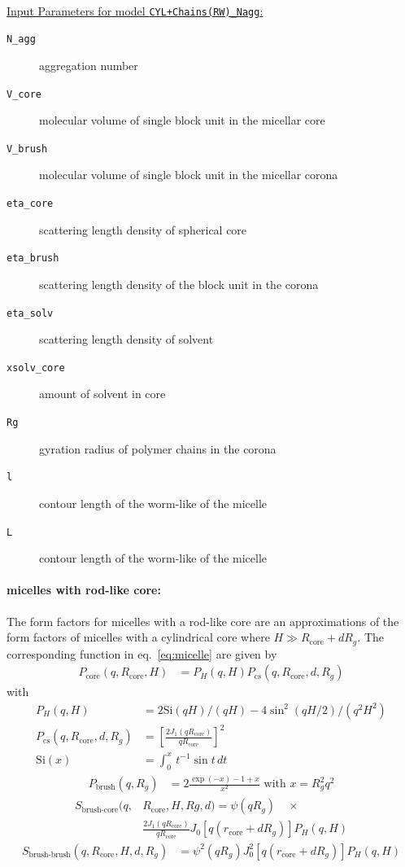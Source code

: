 \hspace{1pt}\\
\uline{Input Parameters for model \texttt{CYL+Chains(RW)\_Nagg}:}
\begin{description}
\item[\texttt{N\_agg}] aggregation number
\item[\texttt{V\_core}] molecular volume of single block unit in the micellar core
\item[\texttt{V\_brush}]  molecular volume of single block unit in the micellar corona
\item[\texttt{eta\_core}] scattering length density of spherical core
\item[\texttt{eta\_brush}] scattering length density of the block unit in the corona
\item[\texttt{eta\_solv}] scattering length density of solvent
\item[\texttt{xsolv\_core}] amount of solvent in core
\item[\texttt{Rg}] gyration radius of polymer chains in the corona
\item[\texttt{l}] contour length of the worm-like of the micelle
\item[\texttt{L}] contour length of the worm-like of the micelle
\end{description}



\clearpage
\noindent\paragraph{micelles with rod-like core:}
The form factors for micelles with a rod-like core are an approximations of the form factors of micelles
with a cylindrical core where $H\gg R_\text{core}+d R_g$. The corresponding function in
eq.\ \ref{eq:micelle} are given by
\begin{align}
P_\text{core}(q,R_\text{core},H) &= P_H(q,H) P_\text{cs}(q,R_\text{core},d,R_g)
\label{eq:rodlikeFF}
\end{align}
with
\begin{align}
P_H(q,H)    &= 2\text{Si}(qH)/(qH) - 4 \sin^2(qH/2)/(q^2H^2) \\
P_\text{cs}(q,R_\text{core},d,R_g) &= \left[ \frac{2J_1(qR_\text{core})}{qR_\text{core}} \right]^2 \\
\text{Si}(x) &= \int_0^x \, t^{-1} \sin t\, dt
\end{align}
\begin{align}
P_\text{brush}(q,R_g)&= 2\frac{\exp(-x)-1+x}{x^2} \text{~with~} x = R_g^2q^2
\end{align}
\begin{align}
S_\text{brush-core}(q,& R_\text{core},H,Rg,d) = \psi(qR_g) \quad \times \\
                           & \frac{2J_1(qR_\text{core})}{qR_\text{core}}
                            J_0[q(r_\text{core}+dR_g)] P_H(q,H) \nonumber
\end{align}
\begin{align}
S_\text{brush-brush}(q,R_\text{core},H,d,R_g) &=
\psi^2(qR_g) J_0^2[q(r_\text{core}+dR_g)] P_H(q,H)
\end{align}

